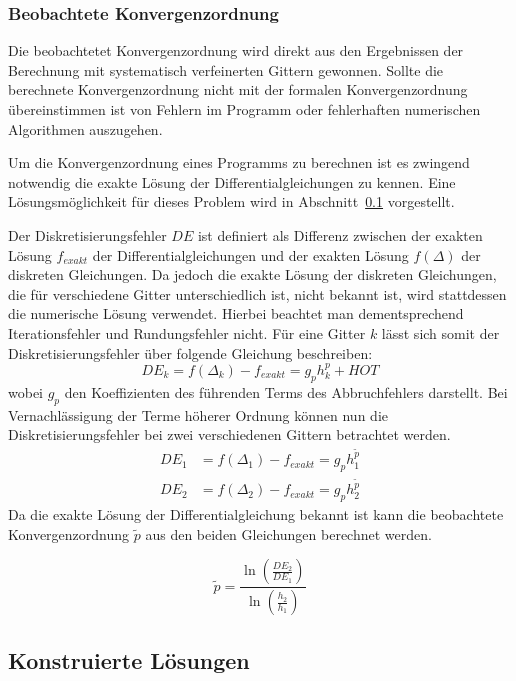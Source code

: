 \subsubsection{Beobachtete Konvergenzordnung}

Die beobachtetet Konvergenzordnung wird direkt aus den Ergebnissen der Berechnung mit systematisch
verfeinerten Gittern gewonnen. Sollte die berechnete Konvergenzordnung nicht mit der formalen
Konvergenzordnung übereinstimmen ist von Fehlern im Programm oder fehlerhaften numerischen Algorithmen auszugehen.

Um die Konvergenzordnung eines Programms zu berechnen ist es zwingend notwendig die exakte Lösung der
Differentialgleichungen zu kennen. Eine Lösungsmöglichkeit für dieses Problem wird in Abschnitt~\ref{sec:man_sol}
vorgestellt.

Der Diskretisierungsfehler $DE$ ist definiert als Differenz zwischen der exakten Lösung $f_{exakt}$
der Differentialgleichungen und der exakten Lösung $f(\Delta)$ der diskreten Gleichungen.
Da jedoch die exakte Lösung der diskreten Gleichungen, die für verschiedene Gitter unterschiedlich ist,
nicht bekannt ist, wird stattdessen die numerische Lösung verwendet. Hierbei beachtet man dementsprechend
Iterationsfehler und Rundungsfehler nicht. Für eine Gitter $k$ lässt sich somit der Diskretisierungsfehler
über folgende Gleichung beschreiben:
\begin{equation*}
  DE_k=f(\Delta_k) - f_{exakt} = g_p h_k^p + HOT
\end{equation*}
wobei $g_p$ den Koeffizienten des führenden Terms des Abbruchfehlers darstellt.
Bei Vernachlässigung der Terme höherer Ordnung können nun die Diskretisierungsfehler bei
zwei verschiedenen Gittern betrachtet werden.
\begin{align*}
  DE_1 &= f(\Delta_1) - f_{exakt} = g_p h_1^{\tilde{p}}\\
  DE_2 &= f(\Delta_2) - f_{exakt} = g_p h_2^{\tilde{p}}
\end{align*}
Da die exakte Lösung der Differentialgleichung bekannt ist kann die beobachtete Konvergenzordnung
$\tilde{p}$ aus den beiden Gleichungen berechnet werden.

\begin{equation}
  \tilde{p}=\frac{\ln \left(\frac{DE_2}{DE_1}\right)}{\ln \left(\frac{h_2}{h_1}\right)}
\end{equation}


\subsection{Konstruierte Lösungen}
\label{sec:man_sol}

